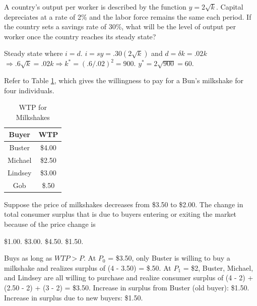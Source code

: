\documentclass[addpoints,11pt]{exam}
\theoremstyle{definition}
\begin{document}
\begin{questions}
\newpage

\question A country's output per worker is described by the function $y=2\sqrt{k}$. Capital depreciates at a rate of 2\% and the labor force remains the same each period. If the country sets a savings rate of 30\%, what will be the level of output per worker once the country reaches its steady state?

\begin{choices}
\end{choices}

\begin{solution}
Steady state where $i = d$. $i=sy = .30(2\sqrt{k})$ and $d=\delta k = .02k$ $\Rightarrow .6\sqrt{k} = .02k \Rightarrow k^* = (.6/.02)^2 = 900$. $y^* = 2\sqrt{900} = 60$.
\end{solution}

\question Refer to Table \ref{wtp}, which gives the willingness to pay for a Bun's milkshake for four individuals.
		
		\begin{table}[h!]
			\caption{WTP for Milkshakes}
			\label{wtp}
			\centering
			\begin{tabular}{  c|c    }    
				
				Buyer   & WTP \\
				\hline
				Buster & \$4.00 \\
				Michael & \$2.50 \\
				Lindsey & \$3.00 \\
				Gob & \$.50 \\
			\end{tabular}
			
		\end{table} 
		
		Suppose the price of milkshakes decreases from \$3.50 to \$2.00. The change in total consumer surplus that is due to buyers entering or exiting the market because of the price change is
		
		\begin{choices}
			\choice \$1.00.
			\choice \$3.00.
			\choice \$4.50.
			\CorrectChoice \$1.50.
		\end{choices}
		
\begin{solution}
Buys as long as $WTP > P$. At $P_0$ = \$3.50, only Buster is willing to buy a milkshake and realizes surplus of (4 - 3.50) = \$.50. At $P_1$ = \$2, Buster, Michael, and Lindsey are all willing to purchase and realize consumer surplus of (4 - 2) + (2.50 - 2) + (3 - 2) = \$3.50. Increase in surplus from Buster (old buyer): \$1.50. Increase in surplus due to new buyers: \$1.50.
\end{solution}


\end{questions}
\end{document}
